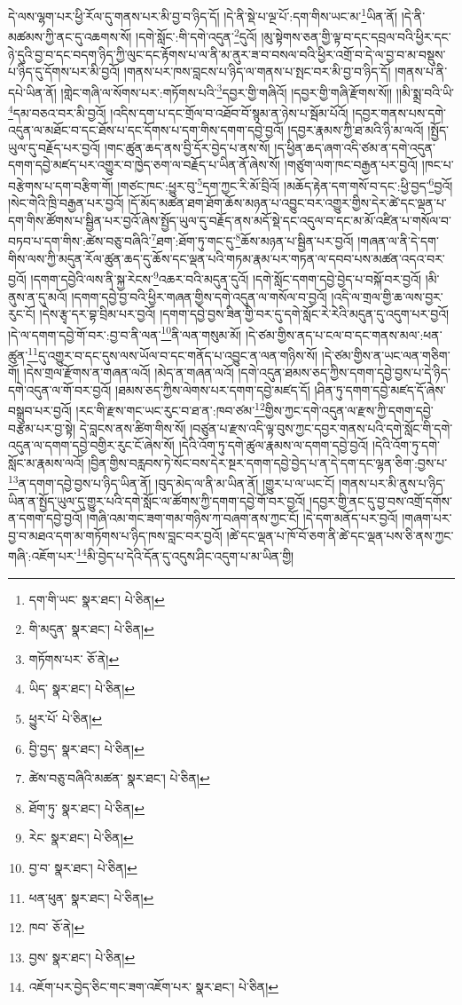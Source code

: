 དེ་ལས་ལྷག་པར་ཕྱི་རོལ་དུ་གནས་པར་མི་བྱ་བ་ཉིད་དོ། །དེ་ནི་སྡེ་པ་ལྔ་པོ་:དག་གིས་ཡང་མ་\footnote{དག་གི་ཡང་  སྣར་ཐང་།  པེ་ཅིན། }ཡིན་ནོ། །དེ་ནི་མཚམས་ཀྱི་ནང་དུ་འཆགས་སོ། །དགེ་སློང་:གི་དགེ་འདུན་\footnote{གི་མདུན་  སྣར་ཐང་།  པེ་ཅིན། }དུའོ། །མུ་སྟེགས་ཅན་གྱི་ལྟ་བ་དང་དབྲལ་བའི་ཕྱིར་དང་ཉེ་དུའི་བྱ་བ་དང་བདག་ཉིད་ཀྱི་ལུང་དང་རྟོགས་པ་ལ་ནི་མ་ནུར་ཟ་བ་བསལ་བའི་ཕྱིར་འགྲོ་བ་དེ་ལ་བྱ་བ་མ་བསྡུས་པ་ཉིད་དུ་དོགས་པར་མི་བྱའོ། །གནས་པར་ཁས་བླངས་པ་ཉིད་ལ་གནས་པ་སྤང་བར་མི་བྱ་བ་ཉིད་དོ། །གནས་པ་ནི་དཔེ་ཡིན་ནོ། །གླེང་གཞི་ལ་སོགས་པར་:གཏོགས་པའི་\footnote{གཏོགས་པར་  ཅོ་ནེ། }དབྱར་གྱི་གཞིའོ། །དབྱར་གྱི་གཞི་རྫོགས་སོ།། །།མི་སྨྲ་བའི་ཡི་\footnote{ཡིད་  སྣར་ཐང་།  པེ་ཅིན། }དམ་བཅའ་བར་མི་བྱའོ། །འདིས་དག་པ་དང་གྲོལ་བ་འཐོབ་བོ་སྙམ་ན་ཉེས་པ་སྦོམ་པོའོ། །དབྱར་གནས་པས་དགེ་འདུན་ལ་མཐོང་བ་དང་ཐོས་པ་དང་དོགས་པ་དག་གིས་དགག་དབྱེ་བྱའོ། །དབྱར་རྣམས་ཀྱི་ཐ་མའི་ཉི་མ་ལའོ། །སྤྱོད་ཡུལ་དུ་བརྗོད་པར་བྱའོ། །གང་ཚུན་ཆད་ནས་བྱི་དོར་བྱེད་པ་ནས་སོ། །ད་ཕྱིན་ཆད་ཞག་འདི་ཙམ་ན་དགེ་འདུན་དགག་དབྱེ་མཛད་པར་འགྱུར་བ་ཁྱེད་ཅག་ལ་བརྗོད་པ་ཡིན་ནོ་ཞེས་སོ། །གཙུག་ལག་ཁང་བརྒྱན་པར་བྱའོ། །ཁང་པ་བརྩེགས་པ་དག་བརྩིག་གོ། །གཙང་ཁང་:ཕྱུར་བུ་\footnote{ཕྱུར་པོ་  པེ་ཅིན། }དག་ཀྱང་རི་མོ་བྲིའོ། །མཆོད་རྟེན་དག་གསོ་བ་དང་:ཕྱི་བྱད་\footnote{བྱི་བྱད་  སྣར་ཐང་།  པེ་ཅིན། }བྱའོ། །སེང་གེའི་ཁྲི་བརྒྱན་པར་བྱའོ། །དོ་མོད་མཚན་ཐག་ཐོག་ཆོས་མཉན་པ་འབྱུང་བར་འགྱུར་གྱིས་དེར་ཚེ་དང་ལྡན་པ་དག་གིས་ཚོགས་པ་སྦྱིན་པར་བྱའོ་ཞེས་སྤྱོད་ཡུལ་དུ་བརྗོད་ནས་མདོ་སྡེ་དང་འདུལ་བ་དང་མ་མོ་འཛིན་པ་གསོལ་བ་བཏབ་པ་དག་གིས་:ཚེས་བཅུ་བཞིའི་\footnote{ཚེས་བཅུ་བཞིའི་མཚན་  སྣར་ཐང་།  པེ་ཅིན། }ཐག་:ཐོག་ཏུ་གང་དུ་\footnote{ཐོག་ཏུ་  སྣར་ཐང་།  པེ་ཅིན། }ཆོས་མཉན་པ་སྦྱིན་པར་བྱའོ། །གཞན་ལ་ནི་དེ་དག་གིས་ལས་ཀྱི་མདུན་རོལ་ཚུན་ཆད་དུ་ཆོས་དང་ལྡན་པའི་གཏམ་རྣམ་པར་གཏན་ལ་དབབ་པས་མཚན་འདའ་བར་བྱའོ། །དགག་དབྱེའི་ལས་ནི་སྐྱ་རེངས་\footnote{རེང་  སྣར་ཐང་།  པེ་ཅིན། }འཆར་བའི་མདུན་དུའོ། །དགེ་སློང་དགག་དབྱེ་བྱེད་པ་བསྐོ་བར་བྱའོ། །མི་ནུས་ན་དུ་མའོ། །དགག་དབྱེ་བྱ་བའི་ཕྱིར་གཞན་གྱིས་དགེ་འདུན་ལ་གསོལ་བ་བྱའོ། །འདི་ལ་གྲལ་གྱི་ཆ་ལས་བྱར་རུང་ངོ། །དེས་རྩྭ་དར་བྷ་བྲིམ་པར་བྱའོ། །དགག་དབྱེ་བྱས་ཟིན་གྱི་བར་དུ་དགེ་སློང་རེ་རེའི་མདུན་དུ་འདུག་པར་བྱའོ། །དེ་ལ་དགག་དབྱེ་གོ་བར་:བྱ་བ་ནི་ལན་\footnote{བྱ་བ་  སྣར་ཐང་།  པེ་ཅིན། }ནི་ལན་གསུམ་མོ། །དེ་ཙམ་གྱིས་ནད་པ་ངལ་བ་དང་གནས་མལ་:ཕན་ཚུན་\footnote{ཕན་ཕུན་  སྣར་ཐང་།  པེ་ཅིན། }དུ་འགྱུར་བ་དང་དུས་ལས་ཡོལ་བ་དང་གནོད་པ་འབྱུང་ན་ལན་གཉིས་སོ། །དེ་ཙམ་གྱིས་ན་ཡང་ལན་གཅིག་གོ། །དེས་གྲལ་རྫོགས་ན་གཞན་ལའོ། །མེད་ན་གཞན་ལའོ། །དགེ་འདུན་ཐམས་ཅད་ཀྱིས་དགག་དབྱེ་བྱས་པ་དེ་ཉིད་དགེ་འདུན་ལ་གོ་བར་བྱའོ། །ཐམས་ཅད་ཀྱིས་ལེགས་པར་དགག་དབྱེ་མཛད་དོ། །ཤིན་ཏུ་དགག་དབྱེ་མཛད་དོ་ཞེས་བསྒྲུབ་པར་བྱའོ། །རང་གི་རྫས་གང་ཡང་རུང་བ་ཐ་ན་:ཁབ་ཙམ་\footnote{ཁབ་  ཅོ་ནེ། }གྱིས་ཀྱང་དགེ་འདུན་ལ་རྫས་ཀྱི་དགག་དབྱེ་བརྩམ་པར་བྱ་སྟེ། དེ་བླངས་ནས་ཚིག་གིས་སོ། །བཙུན་པ་རྫས་འདི་ལྟ་བུས་ཀྱང་དབྱར་གནས་པའི་དགེ་སློང་གི་དགེ་འདུན་ལ་དགག་དབྱེ་བགྱིར་རུང་ངོ་ཞེས་སོ། །དེའི་འོག་ཏུ་དགེ་ཚུལ་རྣམས་ལ་དགག་དབྱེ་བྱའོ། །དེའི་འོག་ཏུ་དགེ་སློང་མ་རྣམས་ལའོ། །བྱིན་གྱིས་བརླབས་ཏེ་སོང་བས་དེར་སྔར་དགག་དབྱེ་བྱེད་པ་ན་དེ་དག་དང་ལྷན་ཅིག་:བྱས་པ་\footnote{བྱས་  སྣར་ཐང་།  པེ་ཅིན། }ན་དགག་དབྱེ་བྱས་པ་ཉིད་ཡིན་ནོ། །བུད་མེད་ལ་ནི་མ་ཡིན་ནོ། །གྱུར་པ་ལ་ཡང་ངོ། །གནས་པར་མི་ནུས་པ་ཉིད་ཡིན་ན་སྤྱོད་ཡུལ་དུ་གྱུར་པའི་དགེ་སློང་ལ་ཚོགས་ཀྱི་དགག་དབྱེ་གོ་བར་བྱའོ། །དབྱར་གྱི་ནང་དུ་བྱ་བས་འགྲོ་དགོས་ན་དགག་དབྱེ་བྱའོ། །གཞི་འམ་གང་ཟག་གམ་གཉིས་ཀ་བཞག་ནས་ཀྱང་ངོ། །དེ་དག་མནོད་པར་བྱའོ། །གཞག་པར་བྱ་བ་མཐའ་དག་མ་གཏོགས་པ་ཉིད་ཁས་བླང་བར་བྱའོ། །ཚེ་དང་ལྡན་པ་ཁོ་བོ་ཅག་ནི་ཚེ་དང་ལྡན་པས་ཅི་ནས་ཀྱང་གཞི་:འཇོག་པར་\footnote{འཇོག་པར་བྱེད་ཅིང་གང་ཟག་འཇོག་པར་  སྣར་ཐང་།  པེ་ཅིན། }མི་བྱེད་པ་དེའི་དོན་དུ་འདུས་ཤིང་འདུག་པ་མ་ཡིན་གྱི། 